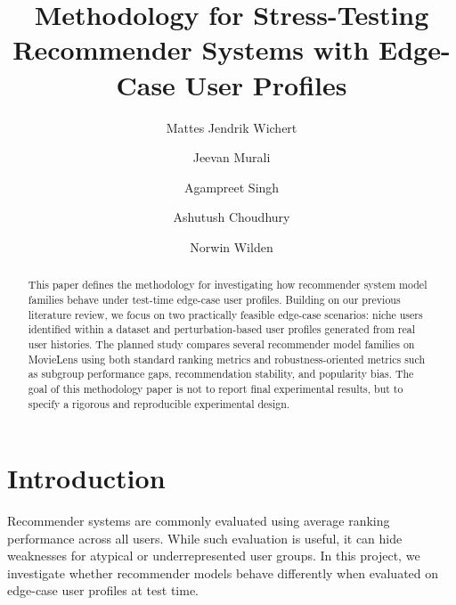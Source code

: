\documentclass[sigconf]{acmart}
\begin{document}
\title{Methodology for Stress-Testing Recommender Systems with Edge-Case User Profiles}

\author{Mattes Jendrik Wichert}

\author{Jeevan Murali}

\author{Agampreet Singh}

\author{Ashutush Choudhury}

\author{Norwin Wilden}

\renewcommand{\shortauthors}{Wichert et al.}

\begin{abstract}
This paper defines the methodology for investigating how recommender system model families behave under test-time edge-case user profiles. Building on our previous literature review, we focus on two practically feasible edge-case scenarios: niche users identified within a dataset and perturbation-based user profiles generated from real user histories. The planned study compares several recommender model families on MovieLens using both standard ranking metrics and robustness-oriented metrics such as subgroup performance gaps, recommendation stability, and popularity bias. The goal of this methodology paper is not to report final experimental results, but to specify a rigorous and reproducible experimental design.
\end{abstract}


\maketitle

\section{Introduction}
Recommender systems are commonly evaluated using average ranking performance across all users. While such evaluation is useful, it can hide weaknesses for atypical or underrepresented user groups. In this project, we investigate whether recommender models behave differently when evaluated on edge-case user profiles at test time.
\end{document}
